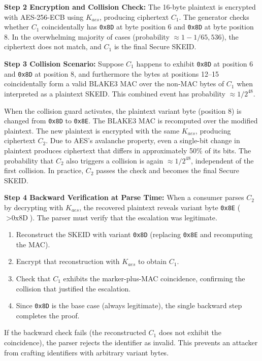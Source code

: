 \documentclass[fleqn,10pt]{wlpeerj}
\providecommand{\tightlist}{%
  \setlength{\itemsep}{0pt}\setlength{\parskip}{0pt}}
\begin{document}
\textbf{Step 2 Encryption and Collision Check:} The 16-byte plaintext is
encrypted with AES-256-ECB using \(K_{aes}\), producing ciphertext
\(C_1\). The generator checks whether \(C_1\) coincidentally has
\texttt{0x8D} at byte position 6 and \texttt{0x8D} at byte position 8.
In the overwhelming majority of cases (probability
\(\approx 1 - 1/65{,}536\)), the ciphertext does not match, and \(C_1\)
is the final Secure SKEID.

\textbf{Step 3 Collision Scenario:} Suppose \(C_1\) happens to exhibit
\texttt{0x8D} at position 6 and \texttt{0x8D} at position 8, and
furthermore the bytes at positions 12--15 coincidentally form a valid
BLAKE3 MAC over the non-MAC bytes of \(C_1\) when interpreted as a
plaintext SKEID. This combined event has probability
\(\approx 1/2^{48}\).

When the collision guard activates, the plaintext variant byte (position
8) is changed from \texttt{0x8D} to \texttt{0x8E}. The BLAKE3 MAC is
recomputed over the modified plaintext. The new plaintext is encrypted
with the same \(K_{aes}\), producing ciphertext \(C_2\). Due to AES's
avalanche property, even a single-bit change in plaintext produces
ciphertext that differs in approximately 50\% of its bits. The
probability that \(C_2\) also triggers a collision is again
\(\approx 1/2^{48}\), independent of the first collision. In practice,
\(C_2\) passes the check and becomes the final Secure SKEID.

\textbf{Step 4 Backward Verification at Parse Time:} When a consumer
parses \(C_2\) by decrypting with \(K_{aes}\), the recovered plaintext
reveals variant byte \texttt{0x8E} (\(> \text{0x8D}\)). The parser must
verify that the escalation was legitimate.

\begin{enumerate}
\def\labelenumi{\arabic{enumi}.}
\tightlist
\item
  Reconstruct the SKEID with variant \texttt{0x8D} (replacing
  \texttt{0x8E} and recomputing the MAC).
\item
  Encrypt that reconstruction with \(K_{aes}\) to obtain \(C_1\).
\item
  Check that \(C_1\) exhibits the marker-plus-MAC coincidence,
  confirming the collision that justified the escalation.
\item
  Since \texttt{0x8D} is the base case (always legitimate), the single
  backward step completes the proof.
\end{enumerate}

If the backward check fails (the reconstructed \(C_1\) does not exhibit
the coincidence), the parser rejects the identifier as invalid. This
prevents an attacker from crafting identifiers with arbitrary variant
bytes.
\end{document}
